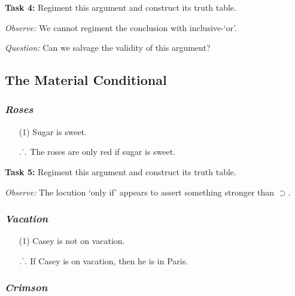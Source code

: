 \documentclass[a4paper, 11pt]{article} %
\def\therefore{\ensuremath{\ldotp\dot{}\,\ldotp}}
\begin{document}
\noindent
\textbf{Task 4:} Regiment this argument and construct its truth table.
\vspace{.05in}

\noindent
\textit{Observe:} We cannot regiment the conclusion with inclusive-`or'.
\vspace{.05in}

\noindent
\textit{Question:} Can we salvage the validity of this argument?



\subsection*{\sc The Material Conditional}

\subsubsection*{\it \textbf{Roses}}

\begin{enumerate}
  \item[(1)] Sugar is sweet.
  \item[\therefore] The roses are only red if sugar is sweet.
\end{enumerate}


\noindent
\textbf{Task 5:} Regiment this argument and construct its truth table.
\vspace{.05in}

\noindent
\textit{Observe:} The locution `only if' appears to assert something stronger than $\supset$.
\vspace{.05in}




\subsubsection*{\it \textbf{Vacation}}

\begin{enumerate}
  \item[(1)] Casey is not on vacation.
  \item[\therefore] If Casey is on vacation, then he is in Paris.
\end{enumerate}





\subsubsection*{\it \textbf{Crimson}}
\end{document}
